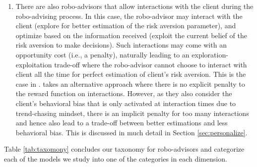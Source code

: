 \begin{enumerate}
\begin{enumerate}
        \item There are also robo-advisors that allow interactions with the client during the robo-advising process. In this case,  the robo-advisor may interact with the client (explore for better estimation of the risk aversion parameter), and optimize based on the information received (exploit the current belief of the risk aversion to make decisions). Such interactions may come with an opportunity cost (i.e., a penalty), naturally leading to an exploration-exploitation trade-off where the robo-advisor cannot choose to interact with client all the time for perfect estimation of client's risk aversion. This is the case in \cite{alsabah2021robo}.  takes an alternative approach where there is no explicit penalty to the reward function on interactions. However, as they also consider the client's behavioral bias that is only activated at interaction times due to trend-chasing mindset, there is an implicit penalty for too many interactions and hence also lead to a trade-off between better estimations and less behavioral bias. This is discussed in much detail in Section \ref{sec:personalize}.
    \end{enumerate}
\end{enumerate}

Table \ref{tab:taxomony} concludes our taxonomy for robo-advisors and categorize each of the models we study into one of the categories in each dimension.
